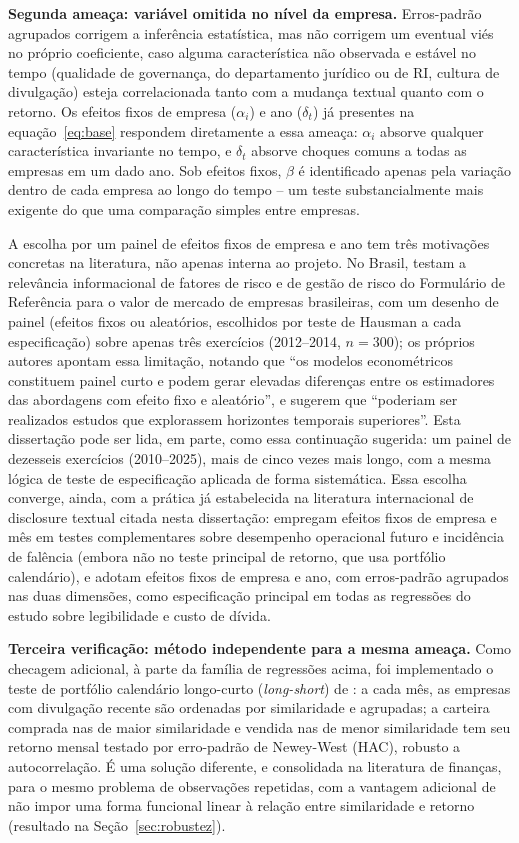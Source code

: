 \documentclass[a4paper,12pt]{report}
\begin{document}
\textbf{Segunda ameaça: variável omitida no nível da empresa.} Erros-padrão agrupados corrigem a inferência estatística, mas não corrigem um eventual viés no próprio coeficiente, caso alguma característica não observada e estável no tempo (qualidade de governança, do departamento jurídico ou de RI, cultura de divulgação) esteja correlacionada tanto com a mudança textual quanto com o retorno. Os efeitos fixos de empresa ($\alpha_i$) e ano ($\delta_t$) já presentes na equação~\ref{eq:base} respondem diretamente a essa ameaça: $\alpha_i$ absorve qualquer característica invariante no tempo, e $\delta_t$ absorve choques comuns a todas as empresas em um dado ano. Sob efeitos fixos, $\beta$ é identificado apenas pela variação dentro de cada empresa ao longo do tempo -- um teste substancialmente mais exigente do que uma comparação simples entre empresas.

A escolha por um painel de efeitos fixos de empresa e ano tem três motivações concretas na literatura, não apenas interna ao projeto. No Brasil,  testam a relevância informacional de fatores de risco e de gestão de risco do Formulário de Referência para o valor de mercado de empresas brasileiras, com um desenho de painel (efeitos fixos ou aleatórios, escolhidos por teste de Hausman a cada especificação) sobre apenas três exercícios (2012--2014, $n=300$); os próprios autores apontam essa limitação, notando que ``os modelos econométricos constituem painel curto e podem gerar elevadas diferenças entre os estimadores das abordagens com efeito fixo e aleatório'', e sugerem que ``poderiam ser realizados estudos que explorassem horizontes temporais superiores''. Esta dissertação pode ser lida, em parte, como essa continuação sugerida: um painel de dezesseis exercícios (2010--2025), mais de cinco vezes mais longo, com a mesma lógica de teste de especificação aplicada de forma sistemática. Essa escolha converge, ainda, com a prática já estabelecida na literatura internacional de disclosure textual citada nesta dissertação:  empregam efeitos fixos de empresa e mês em testes complementares sobre desempenho operacional futuro e incidência de falência (embora não no teste principal de retorno, que usa portfólio calendário), e  adotam efeitos fixos de empresa e ano, com erros-padrão agrupados nas duas dimensões, como especificação principal em todas as regressões do estudo sobre legibilidade e custo de dívida.

\textbf{Terceira verificação: método independente para a mesma ameaça.} Como checagem adicional, à parte da família de regressões acima, foi implementado o teste de portfólio calendário longo-curto (\textit{long-short}) de : a cada mês, as empresas com divulgação recente são ordenadas por similaridade e agrupadas; a carteira comprada nas de maior similaridade e vendida nas de menor similaridade tem seu retorno mensal testado por erro-padrão de Newey-West (HAC), robusto a autocorrelação. É uma solução diferente, e consolidada na literatura de finanças, para o mesmo problema de observações repetidas, com a vantagem adicional de não impor uma forma funcional linear à relação entre similaridade e retorno (resultado na Seção~\ref{sec:robustez}).
\end{document}
